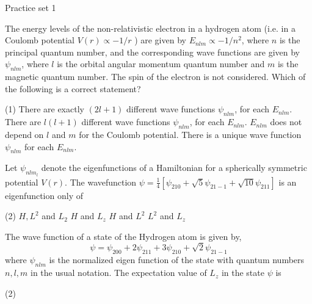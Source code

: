 \newpage
\begin{abox}
	Practice set 1
	\end{abox}
\begin{enumerate}
	\begin{minipage}{\textwidth}
		\item The energy levels of the non-relativistic electron in a hydrogen atom (i.e. in a Coulomb potential $V(r) \propto-1 / r$ ) are given by $E_{n l m} \propto-1 / n^{2}$, where $n$ is the principal quantum number, and the corresponding wave functions are given by $\psi_{n l m}$, where $l$ is the orbital angular momentum quantum number and $m$ is the magnetic quantum number. The spin of the electron is not considered. Which of the following is a correct statement?
	\end{minipage}
	\begin{tasks}(1)
		\task[\textbf{A.}] There are exactly $(2 l+1)$ different wave functions $\psi_{n l m}$, for each $E_{n l m}$.
		\task[\textbf{B.}]There are $l(l+1)$ different wave functions $\psi_{n l m}$, for each $E_{n l m}$.
		\task[\textbf{C.}] $E_{n l m}$ does not depend on $l$ and $m$ for the Coulomb potential.
		\task[\textbf{D.}]There is a unique wave function $\psi_{n l m}$ for each $E_{n l m}$.
	\end{tasks}
\begin{minipage}{\textwidth}
	\item Let $\psi_{n l m_{l}}$ denote the eigenfunctions of a Hamiltonian for a spherically symmetric potential $V(r)$. The wavefunction $\psi=\frac{1}{4}\left[\psi_{210}+\sqrt{5} \psi_{21-1}+\sqrt{10} \psi_{211}\right]$ is an eigenfunction only of
\end{minipage}
\begin{tasks}(2)
	\task[\textbf{A.}] $H, L^{2}$ and $L_{2}$
	\task[\textbf{B.}]$H$ and $L_{z}$
	\task[\textbf{C.}]$H$ and $L^{2}$
	\task[\textbf{D.}]$L^{2}$ and $L_{z}$
\end{tasks}
\begin{minipage}{\textwidth}
	\item The wave function of a state of the Hydrogen atom is given by,
	$$
	\psi=\psi_{200}+2 \psi_{211}+3 \psi_{210}+\sqrt{2} \psi_{21-1}
	$$
	where $\psi_{n l m}$ is the normalized eigen function of the state with quantum numbers $n, l, m$ in the usual notation. The expectation value of $L_{z}$ in the state $\psi$ is
\end{minipage}
\begin{tasks}(2)

\end{tasks}
\end{enumerate}
